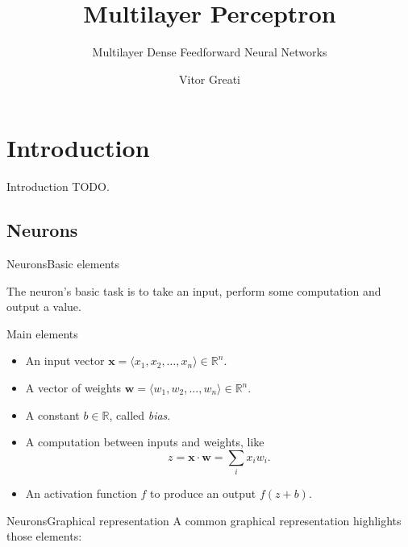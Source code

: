 \documentclass{beamer}
\title{Multilayer Perceptron}
\subtitle{Multilayer Dense Feedforward Neural Networks}
\author{Vitor Greati\inst{1}}
\institute[]
{
	\inst{1}%
	Federal University of Rio Grande do Norte
}
\date{}
\begin{document}
\frame{\titlepage}

\section{Introduction}

    \begin{frame}{Introduction}
        TODO.
    \end{frame}

    \subsection{Neurons}


    \begin{frame}{Neurons}{Basic elements}

        The neuron's basic task is to take an input, perform some computation and
        output a value.

        \begin{block}{Main elements}
            \begin{itemize}
                \item An input vector $\mathbf{x} = \langle x_1, x_2, \ldots, x_n \rangle \in \mathbb{R}^n$.
                \item A vector of weights $\mathbf{w} = \langle w_1, w_2, \ldots, w_n \rangle \in \mathbb{R}^n$.
                \item A constant $b \in \mathbb{R}$, called \emph{bias}.
                \item A computation between inputs and weights, like 
                    $$z=\mathbf{x}\cdot\mathbf{w} =\sum_i x_iw_i.$$
                \item An activation function $f$ to produce an output $f(z + b)$.
            \end{itemize}
        \end{block}
    \end{frame}

    \begin{frame}{Neurons}{Graphical representation}
        A common graphical representation highlights those elements:
        \begin{figure}
            \centering
        \end{figure}
    \end{frame}
\end{document}
